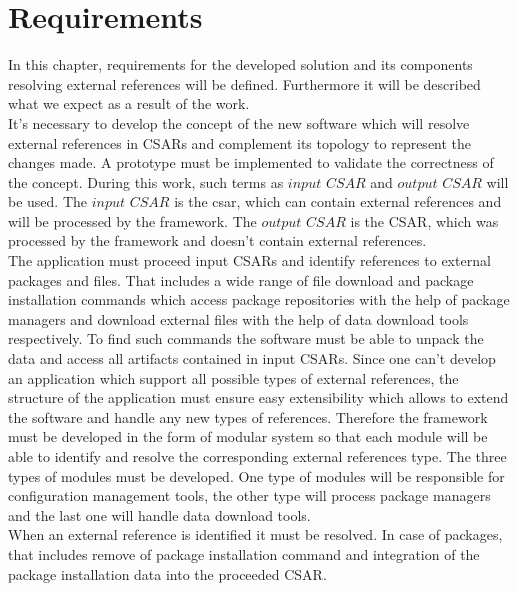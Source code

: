 
\chapter{Requirements}\label{chap:req}
In this chapter, requirements for the developed solution and its components resolving external references will be defined.
Furthermore it will be described what we expect as a result of the work.\\
It's necessary to develop the concept of the new software which will resolve external references in CSARs and complement its topology to represent the changes made.
A prototype must be implemented to validate the correctness of the concept.
During this work, such terms as $input$ $CSAR$ and $output$ $CSAR$ will be used.
The $input$ $CSAR$ is the \gls{csar}, which can contain external references and will be processed by the framework. %
The $output$ $CSAR$ is the CSAR, which was processed by the framework and doesn't contain external references. \\%
The application must proceed input CSARs and identify references to external packages and files.
That includes a wide range of file download and package installation commands which access package repositories with the help of package managers and download external files with the help of data download tools respectively.
To find such commands the software must be able to unpack the data and access all artifacts contained in input CSARs.
Since one can't develop an application which support all possible types of external references, the structure of the application must ensure easy extensibility which allows to extend the software and handle any new types of references.
Therefore the framework must be developed in the form of modular system so that each module will be able to identify and resolve the corresponding external references type.
The three types of modules must be developed.
One type of modules will be responsible for configuration management tools, the other type will process package managers and the last one will handle data download tools.\\
When an external reference is identified it must be resolved. 
In case of packages, that includes remove of package installation command and integration of the package installation data into the proceeded CSAR.
